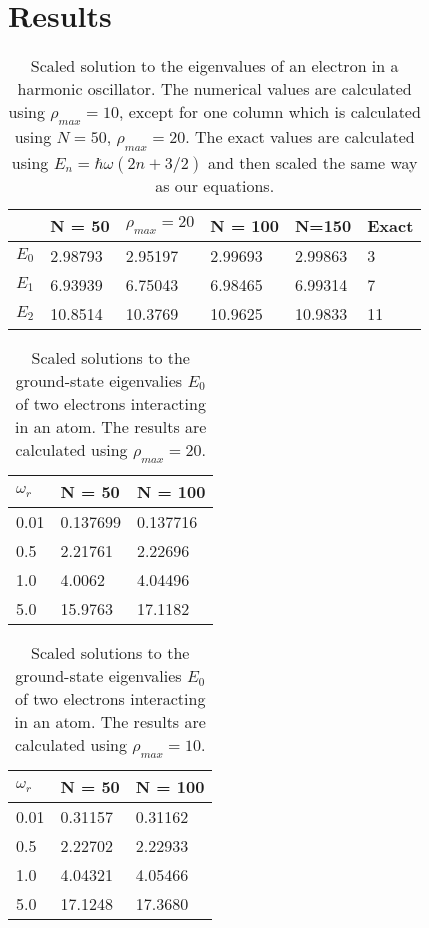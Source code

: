 \documentclass[10pt,showpacs,preprintnumbers,footinbib,amsmath,amssymb,aps,prl,twocolumn,groupedaddress,superscriptaddress,showkeys]{revtex4-1}
\begin{document}
\section{Results}


\begin{table}[h]
\caption{Scaled solution to the eigenvalues of an electron in a harmonic oscillator. The numerical values are calculated using $\rho_{max} = 10$, except for one column which is calculated using $N = 50$, $\rho_{max} = 20$. The exact values are calculated using $E_n = \hbar\omega(2n+3/2)$ and then scaled the same way as our equations.}

\begin{tabular}{|l|l|l|l|l|l|}
\hline
&N = 50&$\rho_{max} = 20$&N = 100 &N=150 & Exact\\
\hline
$E_0$ & 2.98793 &2.95197& 2.99693 & 2.99863 & 3\\
$E_1$ & 6.93939 &6.75043& 6.98465 & 6.99314 & 7\\
$E_2$ & 10.8514 &10.3769& 10.9625 & 10.9833 & 11\\
\hline
\end{tabular}
\label{table:nonInteracting}
\end{table}

\begin{table}[h]
\caption{Scaled solutions to the ground-state eigenvalies $E_0$ of two electrons interacting in an atom. The results are calculated using $\rho_{max} = 20$. }

\begin{tabular}{|l|l|l|}
\hline
$\omega_r$&N = 50&N = 100\\
\hline
0.01 & 0.137699 & 0.137716\\
0.5 & 2.21761 & 2.22696\\
1.0 & 4.0062 & 4.04496\\
5.0 & 15.9763 & 17.1182\\
\hline
\end{tabular}
\label{tabel:interacting20}
\end{table}

\begin{table}[h]
\caption{Scaled solutions to the ground-state eigenvalies $E_0$ of two electrons interacting in an atom. The results are calculated using $\rho_{max} = 10$.}

\begin{tabular}{|l|l|l|}
\hline
$\omega_r$&N = 50&N = 100\\
\hline
0.01 & 0.31157 & 0.31162\\
0.5 & 2.22702 & 2.22933\\
1.0 & 4.04321 & 4.05466\\
5.0 & 17.1248 & 17.3680\\
\hline
\end{tabular}
\label{table:interacting10}
\end{table}
\end{document}
